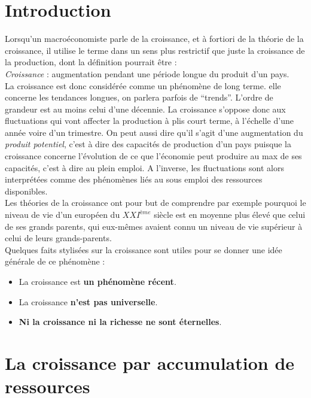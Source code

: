\documentclass[10pt]{book}
\begin{document}
\chapter*{Introduction}
Lorsqu'un macroéconomiste parle de la croissance, et à fortiori de la théorie de la croissance, il utilise le terme dans un sens plus restrictif que juste la croissance de la production, dont la définition pourrait être : \\
\textit{Croissance} : augmentation pendant une période longue du produit d'un pays. \\
La croissance est donc considérée comme un phénomène de long terme. elle concerne les tendances longues, on parlera parfois de ``trends''. L'ordre de grandeur est au moins celui d'une décennie. La croissance s'oppose donc aux fluctuations qui vont affecter la production à plis court terme, à l'échelle d'une année voire d'un trimestre. On peut aussi dire qu'il s'agit d'une augmentation du \textit{produit potentiel}, c'est à dire des capacités de production d'un pays puisque la croissance concerne l'évolution de ce que l'économie peut produire au max de ses capacités, c'est à dire au plein emploi. A l'inverse, les fluctuations sont alors interprétées comme des phénomènes liés au sous emploi des ressources disponibles. \\
Les théories de la croissance ont pour but de comprendre par exemple pourquoi le niveau de vie d'un européen du $XXI^{ème}$ siècle est en moyenne plus élevé que celui de ses grands parents, qui eux-mêmes avaient connu un niveau de vie supérieur à celui de leurs grands-parents. \\
Quelques faits stylisées sur la croissance sont utiles pour se donner une idée générale de ce phénomène : 
\begin{itemize}
  \item La croissance est \textbf{un phénomène récent}.
  \item La croissance \textbf{n'est pas universelle}.
  \item \textbf{Ni la croissance ni la richesse ne sont éternelles}.
\end{itemize}

\chapter{La croissance par accumulation de ressources}
\end{document}
